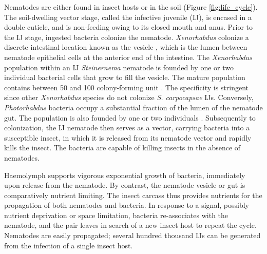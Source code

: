 \documentclass[10pt]{article}
\newcommand{\Scarpo}{\textit{S. carpocapsae} }
\newcommand{\Xeno}{\textit{Xenorhabdus} }
\newcommand{\Stein}{\textit{Steinernema} }
\newcommand{\Photo}{\textit{Photorhabdus} }
\begin{document}
\begin{multicols}{2}
Nematodes are either found in insect hosts or in the soil (Figure \ref{fig:life_cycle}).
The soil-dwelling vector stage, called the infective juvenile (IJ), is encased in a double cuticle, and is non-feeding owing to its closed mouth and anus.
Prior to the IJ stage, ingested bacteria colonize the nematode.
\Xeno colonize a discrete intestinal location known as the vesicle \cite{Chapuis2009}, which is the lumen between nematode epithelial cells at the anterior end of the intestine.
The \Xeno population within an IJ \Stein nematode is founded by one or two individual bacterial cells that grow to fill the vesicle.
The mature population contains between 50 and 100 colony-forming unit \cite{Martens}.
The specificity is stringent since other \Xeno species do not colonize \Scarpo IJs.
Conversely, \Photo bacteria occupy a substantial fraction of the lumen of the nematode gut\cite{Goodrich-Blair2007}.
The population is also founded by one or two individuals \cite{Somvanshi2012}.
Subsequently to colonization, the IJ nematode then serves as a vector, carrying bacteria into a susceptible insect, in which it is released from its nematode vector and rapidly kills the insect.
The bacteria are capable of killing insects in the absence of nematodes.

Haemolymph supports vigorous exponential growth \cite{Somvanshi2012} of bacteria, immediately upon release from the nematode.
By contrast, the nematode vesicle or gut is comparatively nutrient limiting.
The insect carcass thus provides nutrients for the propagation of both nematodes and bacteria.
In response to a signal, possibly nutrient deprivation or space limitation, bacteria re-associates with the nematode, and the pair leaves in search of a new insect host to repeat the cycle.
Nematodes are easily propagated; several hundred thousand IJs can be generated from the infection of a single insect host.


\end{multicols}
\end{document}
